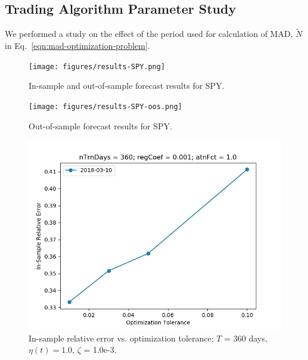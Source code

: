 \documentclass{article}
\begin{document}
\subsection{Trading Algorithm Parameter Study}\label{subsection:mad-parameter-study}

We performed a study on the effect of the period used for calculation
of MAD, $\tilde{N}$ in Eq.~\ref{eqn:mad-optimization-problem}.

\newpage

\begin{figure}
\texttt{[image: figures/results-SPY.png]}
\caption{In-sample and out-of-sample forecast results for SPY.}
\label{fig:results-spy}
\end{figure}

\begin{figure}
\texttt{[image: figures/results-SPY-oos.png]}
\caption{Out-of-sample forecast results for SPY.}
\label{fig:results-spy-oos}
\end{figure}

\begin{figure}
\includegraphics[scale=0.9,bb=0 0 640 480]{figures/tolerance-sensitivity-error.png}
\caption{In-sample relative error vs. optimization tolerance; $T$ =
  360 days, $\eta(t) = 1.0$, $\zeta$ = 1.0e-3.}
\label{fig:tolerance-sensitivity-error}
\end{figure}
\end{document}
